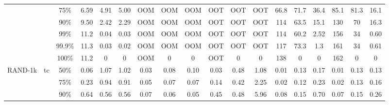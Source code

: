 \documentclass[sigconf,screen,review=false,natbib]{acmart}
\theoremstyle{definition}
\begin{document}
\begin{table*}
\begin{center}
\begin{tabular}{|c|c|c|c|c|c|c|c|c|c|c|c|c|c|c|c|c|c|}
			        &                         & 75\%   & 6.59                      & 4.91                                   & 5.00                       & OOM                                     & OOM                      & OOM  & OOT  & OOT  & OOT  & 66.8 & 71.7 & 36.4 & 85.1 & 81.3 & 16.1 \\
			        &                         & 90\%   & 9.50                      & 2.42                                   & 2.29                       & OOM                                     & OOM                      & OOM  & OOT  & OOT  & OOT  & 114  & 63.5 & 15.1 & 130  & 70   & 16.3 \\
			        &                         & 99\%   & 11.2                      & 0.04                                   & 0.03                       & OOM                                     & OOM                      & OOM  & OOT  & OOT  & OOT  & 114  & 60.2 & 2.52 & 156  & 34   & 0.60 \\
			        &                         & 99.9\% & 11.3                      & 0.03                                   & 0.02                       & OOM                                     & OOM                      & OOM  & OOT  & OOT  & OOT  & 117  & 73.3 & 1.3  & 161  & 34   & 0.61 \\
			        &                         & 100\%  & 11.2                      & 0                                      & 0                          & OOM                                     & 0                        & 0    & OOT  & 0    & 0    & 138  & 0    & 0    & 162  & 0    & 0    \\
			\hline
			RAND-1k & \multirow{6}{*}{tc}     & 50\%   & 0.06                      & 1.07                                   & 1.02                       & 0.03                                    & 0.08                     & 0.10 & 0.03 & 0.48 & 1.08 & 0.01 & 0.13 & 0.17 & 0.01 & 0.13 & 0.13 \\
			        &                         & 75\%   & 0.23                      & 0.94                                   & 0.91                       & 0.05                                    & 0.07                     & 0.07 & 0.14 & 0.42 & 2.25 & 0.02 & 0.12 & 0.23 & 0.02 & 0.13 & 0.16 \\
			        &                         & 90\%   & 0.64                      & 0.56                                   & 0.56                       & 0.07                                    & 0.06                     & 0.05 & 0.45 & 0.48 & 5.96 & 0.08 & 0.15 & 0.70 & 0.07 & 0.15 & 0.26 \\

\end{tabular}
\end{center}
\end{table*}
\end{document}
